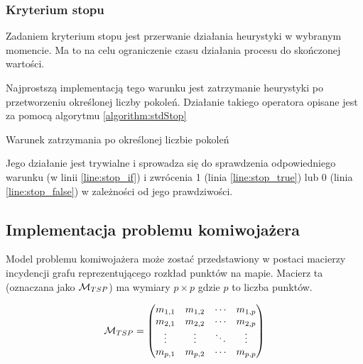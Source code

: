 \documentclass[./FM_mgr.tex]{subfiles}
\begin{document}
	\subsubsection{Kryterium stopu}
	
	Zadaniem kryterium stopu jest przerwanie działania heurystyki w wybranym momencie.
	Ma to na celu ograniczenie czasu działania procesu do skończonej wartości.
	
	Najprostszą implementacją tego warunku jest zatrzymanie heurystyki po przetworzeniu określonej liczby pokoleń.
	Działanie takiego operatora opisane jest za pomocą algorytmu \ref{algorithm:stdStop}
	
	\begin{algorithm}
		\caption{Warunek zatrzymania po określonej liczbie pokoleń \label{algorithm:stdStop}}
		\begin{algorithmic}[1]
			\Start
			\label{line:stop_if}
			\State {}
			\label{line:stop_true}
			\Else
			\State {}
			\label{line:stop_false}
			\EndIf
			\EndOperator
		\end{algorithmic}
	\end{algorithm}
	
	Jego działanie jest trywialne i sprowadza się do sprawdzenia odpowiedniego warunku (w linii \ref{line:stop_if}) i zwrócenia 1 (linia \ref{line:stop_true}) lub 0 (linia \ref{line:stop_false}) w zależności od jego prawdziwości.
	
	\subsection{Implementacja problemu komiwojażera} \label{subsection:tsp_impl}
	
	Model problemu komiwojażera może zostać przedstawiony w postaci macierzy incydencji grafu reprezentującego rozkład punktów na mapie. Macierz ta (oznaczana jako $\mathcal{M}_{TSP}$) ma wymiary $p \times p$ gdzie $p$ to liczba punktów.
	
	\begin{displaymath}
	\mathcal{M}_{TSP} = \begin{pmatrix}
	m_{1,1} & m_{1,2} & \cdots & m_{1,p} \\
	m_{2,1} & m_{2,2} & \cdots & m_{2,p} \\
	\vdots  & \vdots  & \ddots & \vdots  \\
	m_{p,1} & m_{p,2} & \cdots & m_{p,p}
	\end{pmatrix}
	\end{displaymath}
	
\end{document}
